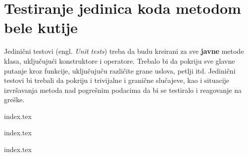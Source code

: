 \section{Testiranje jedinica koda metodom bele kutije}\label{testiranje-jedinica-koda-metodom-bele-kutije}

Jedinični testovi (engl. \emph{Unit tests}) treba da budu kreirani za sve \textbf{javne} metode klasa, uključujući konstruktore i operatore. Trebalo bi da pokriju sve glavne putanje kroz funkcije, uključujuču različite grane uslova, petlji itd. Jedinični testovi bi trebali da pokriju i trivijalne i granične slučajeve, kao i situacije izvršavanja metoda nad pogrešnim podacima da bi se testiralo i reagovanje na greške.

{index.tex}

{index.tex}

{index.tex}
